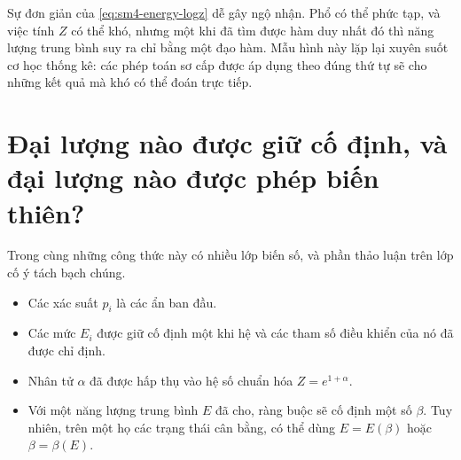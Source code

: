 Sự đơn giản của \eqref{eq:sm4-energy-logz} dễ gây ngộ nhận. Phổ có thể phức tạp, và việc tính \(Z\) có thể khó, nhưng một khi đã tìm được hàm duy nhất đó thì năng lượng trung bình suy ra chỉ bằng một đạo hàm. Mẫu hình này lặp lại xuyên suốt cơ học thống kê: các phép toán sơ cấp được áp dụng theo đúng thứ tự sẽ cho những kết quả mà khó có thể đoán trực tiếp.

\begin{classroomqa}
\end{classroomqa}

\begin{classroomqa}
\end{classroomqa}

\section{Đại lượng nào được giữ cố định, và đại lượng nào được phép biến thiên?}

Trong cùng những công thức này có nhiều lớp biến số, và phần thảo luận trên lớp cố ý tách bạch chúng.

\begin{itemize}
 \item Các xác suất \(p_i\) là các ẩn ban đầu.
 \item Các mức \(E_i\) được giữ cố định một khi hệ và các tham số điều khiển của nó đã được chỉ định.
 \item Nhân tử \(\alpha\) đã được hấp thụ vào hệ số chuẩn hóa
 \(Z=e^{1+\alpha}\).
 \item Với một năng lượng trung bình \(E\) đã cho, ràng buộc sẽ cố định một số
 \(\beta\). Tuy nhiên, trên một họ các trạng thái cân bằng, có thể dùng
 \(E=E(\beta)\) hoặc \(\beta=\beta(E)\).
\end{itemize}

